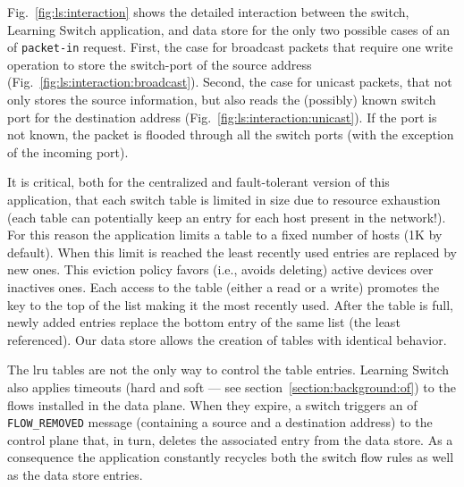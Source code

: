 Fig.~\ref{fig:ls:interaction}  shows the detailed interaction between the switch, Learning Switch application, and data store for the only two possible cases of an \gls{of} \texttt{packet-in} request. 
First, the case for broadcast packets that require one write operation to store the switch-port  of the source address (Fig.~\ref{fig:ls:interaction:broadcast}). 
Second,  the case for unicast packets, that not only stores the source information, but also reads the (possibly) known switch port for the destination address (Fig.~\ref{fig:ls:interaction:unicast}). 
If the port is not known, the packet is flooded through all the switch ports (with the exception of the incoming port). 


It is critical, both for the centralized and fault-tolerant version of this application, that each switch table is limited in size  due to resource exhaustion (each table can potentially keep an entry for each host present in the network!).
For this reason the application limits a table to a fixed number of hosts (1K by default).
When this limit is reached the least recently used entries are replaced by new ones.  
This eviction policy favors (i.e., avoids deleting) active devices over inactives ones.
Each access to the table (either a read or a write) promotes the key to the top of the list making it the most recently used.
After the table is full, newly added entries replace the bottom entry of the same list (the least referenced). Our data store allows the creation of tables with identical behavior. 

The \gls{lru} tables are not the only way to control the table entries. Learning Switch also applies timeouts (hard and soft --- see section~\ref{section:background:of})  to the flows installed in the data plane. 
When they expire, a switch triggers an \gls{of} \texttt{FLOW\_REMOVED} message (containing a source and a destination address) to the control plane that, in turn, deletes the associated entry from the data store. 
As a consequence the application constantly recycles both the switch flow rules as well as the data store entries. 

